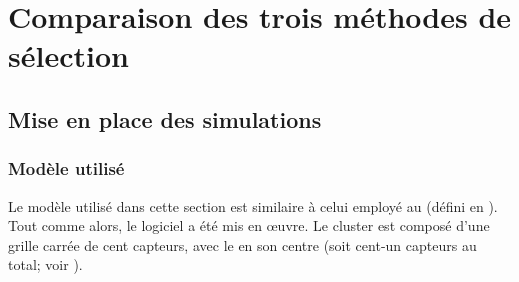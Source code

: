 \section{Comparaison des trois méthodes de sélection}

    \subsection{Mise en place des simulations}

        \subsubsection{Modèle utilisé}

Le modèle utilisé dans cette section est similaire à celui employé au  (défini en ).
Tout comme alors, le logiciel \nsii a été mis en œuvre.
Le cluster est composé d'une grille carrée de cent capteurs, avec le \ch en son centre (soit cent-un capteurs au total; voir ).


